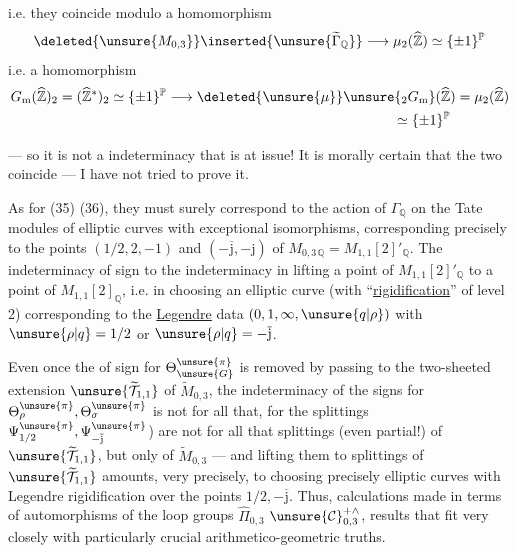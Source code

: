 i.e. they coincide modulo a homomorphism
\[
\deleted{\unsure{M_{0,3}}}\inserted{\unsure{\widetilde\Gamma_{\mathbb Q}}}
\longrightarrow\mu_2(\widehat{\mathbb Z})\simeq\{\pm1\}^{\mathbb P}
\]
i.e. a homomorphism
\[
\begin{aligned}
G_{\mathrm m}(\widehat{\mathbb Z})_2
&=(\widehat{\mathbb Z}^{*})_2\simeq\{\pm1\}^{\mathbb P}
\longrightarrow\deleted{\unsure{\mu}}\unsure{{}_2G_{\mathrm m}}(\widehat{\mathbb Z})
=\mu_2(\widehat{\mathbb Z})\\
&\hspace{24em}\simeq\{\pm1\}^{\mathbb P}
\end{aligned}
\]

--- so it is not a  indeterminacy that is at issue!
It is morally certain that the two coincide --- I have not tried to
prove it.

As for (35) (36), they must surely correspond to the action of
$\Gamma_{\mathbb Q}$ on the Tate modules of elliptic curves with
exceptional isomorphisms, corresponding precisely to the points
$(1/2,2,-1)$ and $(-\overline{\mathrm j},-\mathrm j)$ of
$M_{0,3\,\mathbb Q}=M_{1,1}[2]'_{\mathbb Q}$.
The indeterminacy of sign   to the indeterminacy
in lifting a point of $M_{1,1}[2]'_{\mathbb Q}$ to a point of
$M_{1,1}[2]_{\mathbb Q}$, i.e. in choosing an elliptic curve
(with ``\uline{rigidification}'' of level 2) corresponding to the
\uline{Legendre} data $(0,1,\infty,\unsure{q|\rho})$ with
$\unsure{\rho|q}=1/2$ or $\unsure{\rho|q}=-\overline{\mathrm j}$.

Even once the  of sign for
$\Theta_{\unsure{G}}^{\unsure{\pi}}$ is removed by passing to the two-sheeted extension
$\unsure{\widetilde{\mathcal T}_{1,1}}$ of
$\widetilde M_{0,3}$, the indeterminacy of the signs for
$\Theta_{\rho}^{\unsure{\pi}},\Theta_{\sigma}^{\unsure{\pi}}$
is not  for all that, for the splittings
\deleted{$\unsure{\Psi_{\rho}^{\pi},\Psi_{\sigma}^{\pi}}$}
$\Psi_{1/2}^{\unsure{\pi}},\Psi_{-\overline{\mathrm j}}^{\unsure{\pi}}$)
are not for all that splittings (even partial!)
of  
$\unsure{\widetilde{\mathcal T}_{1,1}}$, but only of
$\widetilde M_{0,3}$ --- and lifting them to splittings of
$\unsure{\widetilde{\mathcal T}_{1,1}}$
amounts, very precisely, to choosing precisely elliptic curves with
Legendre rigidification over the points $1/2,-\overline{\mathrm j}$.
Thus, calculations made in terms of automorphisms of the loop groups
$\widehat\Pi_{0,3}$  
$\unsure{\mathcal{C}}_{0,3}^{+\wedge}$,
 
results that fit very closely with particularly crucial
arithmetico-geometric truths.

